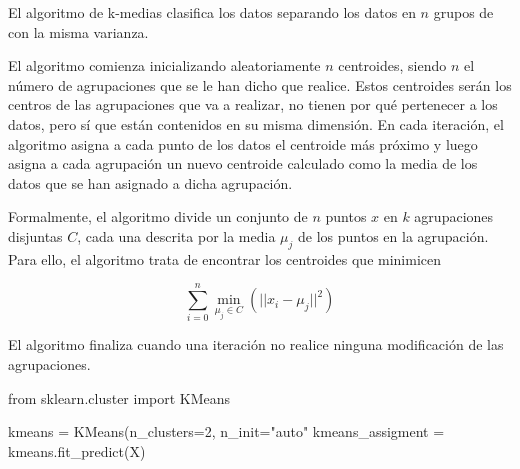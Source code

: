 El algoritmo de k-medias clasifica los datos separando los datos en $n$ grupos de con la misma varianza.

El algoritmo comienza inicializando aleatoriamente $n$ centroides, siendo $n$ el número de agrupaciones que se le han dicho que realice. Estos centroides serán los centros de las agrupaciones que va a realizar, no tienen por qué pertenecer a los datos, pero sí que están contenidos en su misma dimensión. En cada iteración, el algoritmo asigna a cada punto de los datos el centroide más próximo y luego asigna a cada agrupación un nuevo centroide calculado como la media de los datos que se han asignado a dicha agrupación.

Formalmente, el algoritmo divide un conjunto de $n$ puntos $x$ en $k$ agrupaciones disjuntas $C$, cada una descrita por la media $\mu_j$ de los puntos en la agrupación. Para ello, el algoritmo trata de encontrar los centroides que minimicen

\begin{equation}
  \sum\limits_{i=0}^n \underset{\mu_j \in C}{\operatorname{min}} (|| x_i - \mu_j||^2)
\end{equation}

El algoritmo finaliza cuando una iteración no realice ninguna modificación de las agrupaciones.

\newpage
\begin{mypython}[float={h},caption={k-medias.}]
  from sklearn.cluster import KMeans

  kmeans = KMeans(n_clusters=2, n_init="auto"
  kmeans_assigment = kmeans.fit_predict(X)
\end{mypython}

